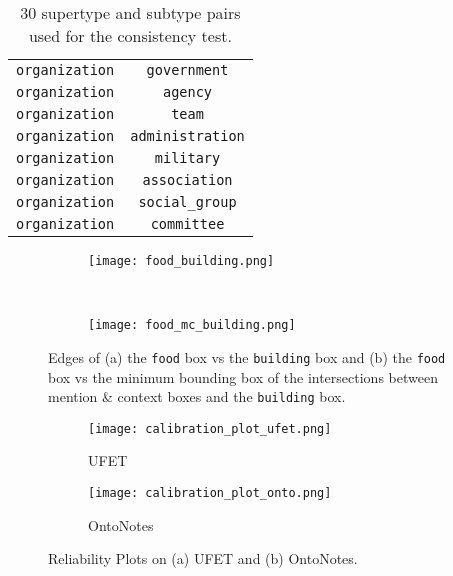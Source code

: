 \documentclass[11pt,a4paper]{article}
\begin{document}
\begin{table}[H]
\begin{tabular}{c c}
        {\tt organization} & {\tt government} \\
        {\tt organization} & {\tt agency} \\
        {\tt organization} & {\tt team} \\
        {\tt organization} & {\tt administration} \\
        {\tt organization} & {\tt military} \\
        {\tt organization} & {\tt association} \\
        {\tt organization} & {\tt social\_group} \\
        {\tt organization} & {\tt committee} \\
		\bottomrule
	\end{tabular}
	\caption{30 supertype and subtype pairs used for the consistency test.}
	\label{tab:30types}
\end{table}




\begin{figure*}[t!]
\centering
\begin{subfigure}[H]{\linewidth}
  \texttt{[image: food\_building.png]}
  \vspace{-16pt}
  \caption{}
\end{subfigure}\\
\vspace{6pt}
\begin{subfigure}[H]{\linewidth}
  \texttt{[image: food\_mc\_building.png]}
  \vspace{-16pt}
  \caption{}
\end{subfigure}
\vspace{-6pt}
\caption{Edges of (a) the {\tt food} box vs the {\tt building} box and (b) the {\tt food} box vs the minimum bounding box of the intersections between mention \& context boxes and the {\tt building} box.}
\label{fig:edges2}
\end{figure*}



\begin{figure*}[t]
\centering
\begin{subfigure}[H]{\columnwidth}
\centering
   \texttt{[image: calibration\_plot\_ufet.png]}
   \caption{UFET}
\end{subfigure}
\begin{subfigure}[H]{\columnwidth}
\centering
   \texttt{[image: calibration\_plot\_onto.png]}
   \caption{OntoNotes}
\end{subfigure}
\caption{Reliability Plots on (a) UFET and (b) OntoNotes.}
\label{fig:calibration}
\end{figure*}
\end{document}
